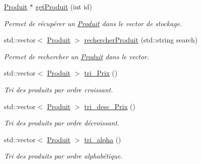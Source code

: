 \begin{DoxyCompactItemize}
\hyperlink{classProduit}{Produit} $\ast$ \hyperlink{classBdd_a1d09b2925efed0c4364fb6a753458f36}{get\-Produit} (int id)
\begin{DoxyCompactList}\small\item\em Permet de récupérer un \hyperlink{classProduit}{Produit} dans le vector de stockage. \end{DoxyCompactList}\item 
std\-::vector$<$ \hyperlink{classProduit}{Produit} $>$ \hyperlink{classBdd_a9a02865ead592f460c1470eb823efd27}{rechercher\-Produit} (std\-::string search)
\begin{DoxyCompactList}\small\item\em Permet de rechercher un \hyperlink{classProduit}{Produit} dans le vector. \end{DoxyCompactList}\item 
std\-::vector$<$ \hyperlink{classProduit}{Produit} $>$ \hyperlink{classBdd_a4b2ff1e090847959e06ea05ca9420bd8}{tri\-\_\-\-Prix} ()
\begin{DoxyCompactList}\small\item\em Tri des produits par ordre croissant. \end{DoxyCompactList}\item 
std\-::vector$<$ \hyperlink{classProduit}{Produit} $>$ \hyperlink{classBdd_aabeda2da6b014c697dda2c6138238485}{tri\-\_\-desc\-\_\-\-Prix} ()
\begin{DoxyCompactList}\small\item\em Tri des produits par ordre décroissant. \end{DoxyCompactList}\item 
std\-::vector$<$ \hyperlink{classProduit}{Produit} $>$ \hyperlink{classBdd_a9856e8aab1e9fea711bc3926d6d12806}{tri\-\_\-alpha} ()
\begin{DoxyCompactList}\small\item\em Tri des produits par ordre alphabétique. \end{DoxyCompactList}\end{DoxyCompactItemize}
